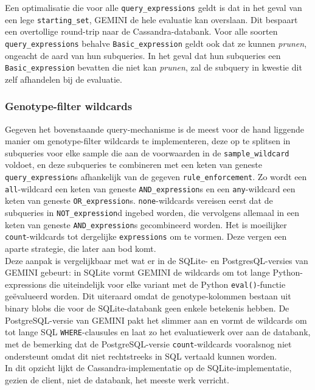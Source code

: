 Een optimalisatie die voor alle \texttt{query\_expressions} geldt is dat in het geval van een lege \texttt{starting\_set}, GEMINI de hele evaluatie kan overslaan. Dit bespaart een overtollige round-trip naar de Cassandra-databank. Voor alle soorten \texttt{query\_expressions} behalve \texttt{Basic\_expression} geldt ook dat ze kunnen \textit{prunen}, ongeacht de aard van hun subqueries. In het geval dat hun subqueries een \texttt{Basic\_expression} bevatten die niet kan \textit{prunen}, zal de subquery in kwestie dit zelf afhandelen bij de evaluatie.

\subsubsection{Genotype-filter wildcards}
\label{gt_wildcards}

Gegeven het bovenstaande query-mechanisme is de meest voor de hand liggende manier om genotype-filter wildcards te implementeren, deze op te splitsen in subqueries voor elke sample die aan de voorwaarden in de \texttt{sample\_wildcard} voldoet, en deze subqueries te combineren met een keten van geneste \texttt{query\_expression}s afhankelijk van de gegeven \texttt{rule\_enforcement}. Zo wordt een \texttt{all}-wildcard een keten van geneste \texttt{AND\_expression}s en een \texttt{any}-wildcard een keten van geneste \texttt{OR\_expression}s. \texttt{none}-wildcards vereisen eerst dat de subqueries in \texttt{NOT\_expression}d ingebed worden, die vervolgens allemaal in een keten van geneste \texttt{AND\_expression}s gecombineerd worden. Het is moeilijker \texttt{count}-wildcards tot dergelijke \texttt{expressions} om te vormen. Deze vergen een aparte strategie, die later aan bod komt.\\
Deze aanpak is vergelijkbaar met wat er in de SQLite- en PostgresQL-versies van GEMINI gebeurt: in SQLite vormt GEMINI de wildcards om tot lange Python-expressions die uiteindelijk voor elke variant met de Python \texttt{eval()}-functie ge\"evalueerd worden. Dit uiteraard omdat de genotype-kolommen bestaan uit binary blobs die voor de SQLite-databank geen enkele betekenis hebben. De PostgreSQL-versie van GEMINI pakt het slimmer aan en vormt de wildcards om tot lange SQL \texttt{WHERE}-clausules en laat zo het evaluatiewerk over aan de databank, met de bemerking dat de PostgreSQL-versie \texttt{count}-wildcards vooralsnog niet ondersteunt omdat dit niet rechtstreeks in SQL vertaald kunnen worden.\\
In dit opzicht lijkt de Cassandra-implementatie op de SQLite-implementatie, gezien de client, niet de databank, het meeste werk verricht.\\

